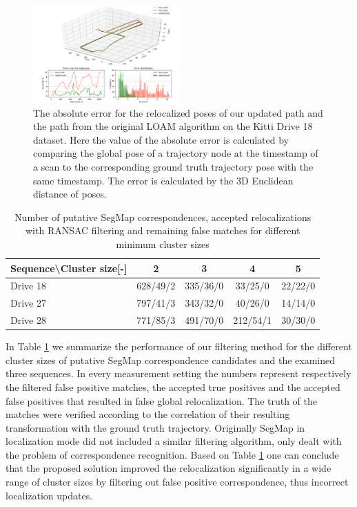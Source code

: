 \documentclass[letterpaper, 10 pt, conference]{ieeeconf}  %
\begin{document}
\begin{figure}[!t]
\centerline{\includegraphics[width=0.5\textwidth]{figures/full_evaluate_18.png}}\par
\caption{The absolute error for the relocalized poses of our updated path and the path from the original LOAM algorithm on the Kitti Drive 18 dataset. Here the value of the absolute error is calculated by comparing the global pose of a trajectory node at the timestamp of a scan to the corresponding ground truth trajectory pose with the same timestamp. The error is calculated by the 3D Euclidean distance of poses.}
\label{fig:abs_error}
\end{figure}


\begin{table}[!t]
\centering
\caption{Number of putative SegMap correspondences, accepted relocalizations with RANSAC filtering and remaining false matches for different minimum cluster sizes}
\begin{tabular}{|l|c|c|c|c|}
\hline
Sequence\textbackslash Cluster size[-] & 2 & 3 & 4 & 5\\
\hline
Drive 18 & 628/49/2 &335/36/0 & 33/25/0 &22/22/0\\
Drive 27& 797/41/3 & 343/32/0 & 40/26/0 & 14/14/0\\
Drive 28 & 771/85/3& 491/70/0 & 212/54/1 &30/30/0\\
\hline
\end{tabular}
\label{tab:ransac_table}
\end{table}

In Table \ref{tab:ransac_table} we summarize the performance of our filtering method for the different cluster sizes of putative SegMap correspondence candidates and the examined three sequences. In every measurement setting the numbers represent respectively the filtered false positive matches, the accepted true positives and the accepted false positives that resulted in false global relocalization. The truth of the matches were verified according to the correlation of their resulting transformation with the ground truth trajectory. Originally SegMap in localization mode did not included a similar filtering algorithm, only dealt with the problem of correspondence recognition. Based on Table \ref{tab:ransac_table} one can conclude that the proposed solution improved the relocalization significantly in a wide range of cluster sizes by filtering out false positive correspondence, thus incorrect localization updates.
\end{document}
